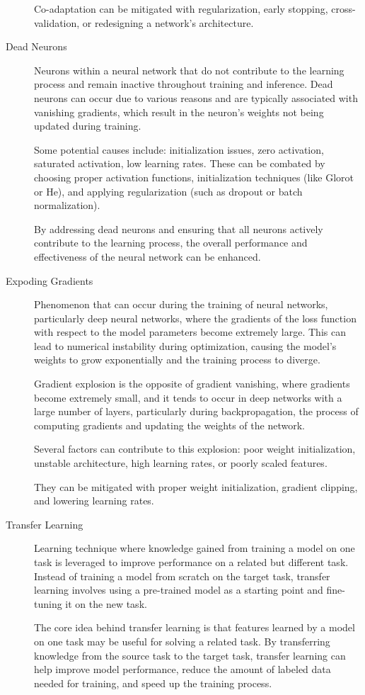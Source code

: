 \documentclass[a4paper]{article}
\begin{document}
\begin{description}
Co-adaptation can be mitigated with regularization, early stopping, cross-validation, or redesigning a network's architecture.

\item[Dead Neurons]
Neurons within a neural network that do not contribute to the learning process and remain inactive throughout training and inference. Dead neurons can occur due to various reasons and are typically associated with vanishing gradients, which result in the neuron's weights not being updated during training.

Some potential causes include: initialization issues, zero activation, saturated activation, low learning rates. These can be combated by choosing proper activation functions, initialization techniques (like Glorot or He), and applying regularization (such as dropout or batch normalization).

By addressing dead neurons and ensuring that all neurons actively contribute to the learning process, the overall performance and effectiveness of the neural network can be enhanced.

\item[Expoding Gradients]
Phenomenon that can occur during the training of neural networks, particularly deep neural networks, where the gradients of the loss function with respect to the model parameters become extremely large. This can lead to numerical instability during optimization, causing the model's weights to grow exponentially and the training process to diverge.

Gradient explosion is the opposite of gradient vanishing, where gradients become extremely small, and it tends to occur in deep networks with a large number of layers, particularly during backpropagation, the process of computing gradients and updating the weights of the network.

Several factors can contribute to this explosion: poor weight initialization, unstable architecture, high learning rates, or poorly scaled features.

They can be mitigated with proper weight initialization, gradient clipping, and lowering learning rates.

\item[Transfer Learning]
Learning technique where knowledge gained from training a model on one task is leveraged to improve performance on a related but different task. Instead of training a model from scratch on the target task, transfer learning involves using a pre-trained model as a starting point and fine-tuning it on the new task.

The core idea behind transfer learning is that features learned by a model on one task may be useful for solving a related task. By transferring knowledge from the source task to the target task, transfer learning can help improve model performance, reduce the amount of labeled data needed for training, and speed up the training process.
\end{description}
\end{document}

